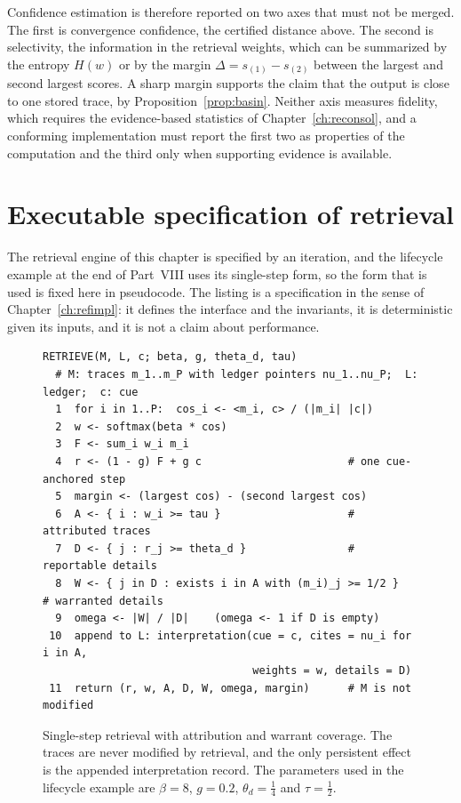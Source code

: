 Confidence estimation is therefore reported on two axes that must not be merged. The first is convergence confidence, the certified distance above. The second is selectivity, the information in the retrieval weights, which can be summarized by the entropy $H(w)$ or by the margin $\Delta=s_{(1)}-s_{(2)}$ between the largest and second largest scores. A sharp margin supports the claim that the output is close to one stored trace, by Proposition~\ref{prop:basin}. Neither axis measures fidelity, which requires the evidence-based statistics of Chapter~\ref{ch:reconsol}, and a conforming implementation must report the first two as properties of the computation and the third only when supporting evidence is available.

\section*{Executable specification of retrieval}\label{sec:retrievecode}

The retrieval engine of this chapter is specified by an iteration, and the lifecycle example at the end of Part~VIII uses its single-step form, so the form that is used is fixed here in pseudocode. The listing is a specification in the sense of Chapter~\ref{ch:refimpl}: it defines the interface and the invariants, it is deterministic given its inputs, and it is not a claim about performance.

\begin{figure}[t]
\centering
\begin{Verbatim}[fontsize=\footnotesize,frame=single,framesep=2mm]
RETRIEVE(M, L, c; beta, g, theta_d, tau)
  # M: traces m_1..m_P with ledger pointers nu_1..nu_P;  L: ledger;  c: cue
  1  for i in 1..P:  cos_i <- <m_i, c> / (|m_i| |c|)
  2  w <- softmax(beta * cos)
  3  F <- sum_i w_i m_i
  4  r <- (1 - g) F + g c                       # one cue-anchored step
  5  margin <- (largest cos) - (second largest cos)
  6  A <- { i : w_i >= tau }                    # attributed traces
  7  D <- { j : r_j >= theta_d }                # reportable details
  8  W <- { j in D : exists i in A with (m_i)_j >= 1/2 }   # warranted details
  9  omega <- |W| / |D|    (omega <- 1 if D is empty)
 10  append to L: interpretation(cue = c, cites = nu_i for i in A,
                                 weights = w, details = D)
 11  return (r, w, A, D, W, omega, margin)      # M is not modified
\end{Verbatim}
\caption{Single-step retrieval with attribution and warrant coverage. The traces are never modified by retrieval, and the only persistent effect is the appended interpretation record. The parameters used in the lifecycle example are $\beta=8$, $g=0.2$, $\theta_d=\tfrac14$ and $\tau=\tfrac12$.}\label{fig:retrievecode}
\end{figure}

